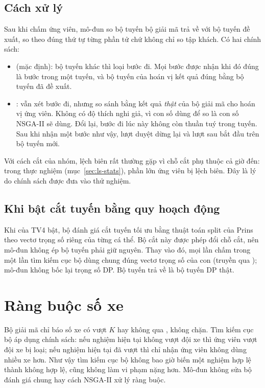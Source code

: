 \subsection{Cách xử lý}

Sau khi chấm ứng viên, mô-đun so bộ tuyến bộ giải mã trả về với bộ tuyến đề xuất, so theo đúng thứ tự
từng phần tử chứ không chỉ so tập khách. Có hai chính sách:
\begin{itemize}
  \item {} (mặc định): bộ tuyến khác thì loại bước đi. Mọi bước được nhận khi đó đúng là bước
        trong một tuyến, và bộ tuyến của hoán vị kết quả đúng bằng bộ tuyến đã đề xuất.
  \item {}: vẫn xét bước đi, nhưng so sánh bằng kết quả \emph{thật} của bộ giải mã
        cho hoán vị ứng viên. Không có độ thích nghi giả, vì con số dùng để so là con số NSGA-II sẽ dùng.
        Đổi lại, bước đi lúc này không còn thuần tuý trong tuyến. Sau khi nhận một bước như vậy, lượt
        duyệt dừng lại và lượt sau bắt đầu trên bộ tuyến mới.
\end{itemize}
Với cách cắt  của nhóm, lệch biên rất thường gặp vì chỗ cắt phụ thuộc cả giờ đến:
trong thực nghiệm (mục~\ref{sec:ls-stats}), phần lớn ứng viên bị lệch biên. Đây là lý do chính sách
 được đưa vào thử nghiệm.

\subsection{Khi bật cắt tuyến bằng quy hoạch động}

Khi  của TV4 bật, bộ đánh giá cắt tuyến tối ưu bằng thuật toán split của Prins~\cite{prins2004} theo vectơ trọng số riêng của từng cá
thể. Bộ cắt này được phép đổi chỗ cắt, nên mô-đun không ép bộ tuyến phải giữ nguyên. Thay vào đó, mọi
lần chấm trong một lần tìm kiếm cục bộ dùng chung đúng vectơ trọng số của con (truyền qua
); mô-đun không bốc lại trọng số DP. Bộ tuyến trả về là bộ tuyến DP thật.

\section{Ràng buộc số xe}

Bộ giải mã chỉ báo số xe có vượt $K$ hay không qua , không chặn. Tìm kiếm cục bộ áp dụng
chính sách: nếu nghiệm hiện tại không vượt đội xe thì ứng viên vượt đội xe bị loại; nếu nghiệm hiện tại
đã vượt thì chỉ nhận ứng viên không dùng nhiều xe hơn. Như vậy tìm kiếm cục bộ không bao giờ biến một
nghiệm hợp lệ thành không hợp lệ, cũng không làm vi phạm nặng hơn. Mô-đun không sửa bộ đánh giá chung
hay cách NSGA-II xử lý ràng buộc.

